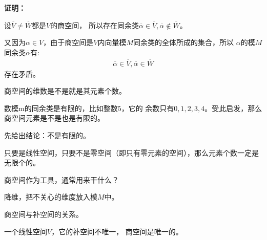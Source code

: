 \documentclass{article}
\begin{document}
\textbf{证明：}

设$\overline{V} \neq \overline{W}$都是$V$的商空间，
所以存在同余类$\overline{\alpha} \in \overline{V}, \overline{\alpha} \notin \overline{W}$。

又因为$\alpha \in V$，由于商空间是$V$内向量模$M$同余类的全体所成的集合，所以
$\alpha$的模$M$同余类$\overline{\alpha}$有:
\begin{align*}
  \overline{\alpha} \in \overline{V}, \overline{\alpha} \in \overline{W}
\end{align*}
存在矛盾。

\begin{zremark}
  商空间的维数是不是就是其元素个数。
\end{zremark}

数模m的同余类是有限的，比如整数$5$，它的
余数只有$0, 1, 2, 3, 4$。受此启发，那么商空间元素是不是也是有限的。

先给出结论：不是有限的。

只要是线性空间，只要不是零空间（即只有零元素的空间），那么元素个数一定是无限个的。

\begin{zremark}
  商空间作为工具，通常用来干什么？
\end{zremark}

降维，把不关心的维度放入模$M$中。

\begin{zremark}
  商空间与补空间的关系。
\end{zremark}

一个线性空间$V$，它的补空间不唯一，
商空间是唯一的。
\end{document}
